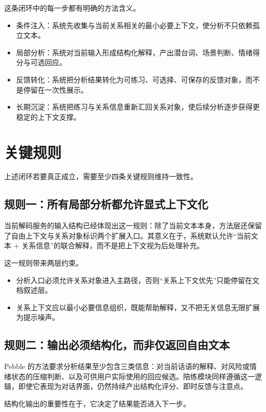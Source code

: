 这条闭环中的每一步都有明确的方法含义。

\begin{itemize}
  \item 条件注入：系统先收集与当前关系相关的最小必要上下文，使分析不只依赖孤立文本。
  \item 局部分析：系统对当前输入形成结构化解释，产出潜台词、场景判断、情绪得分与可选回应。
  \item 反馈转化：系统把分析结果转化为可练习、可选择、可保存的反馈对象，而不是停留在一次性展示。
  \item 长期沉淀：系统把练习与关系信息重新汇回关系对象，使后续分析逐步获得更稳定的上下文支撑。
\end{itemize}

\section{关键规则}

上述闭环若要真正成立，需要至少四条关键规则维持一致性。

\subsection{规则一：所有局部分析都允许显式上下文化}

当前解码服务的输入结构已经体现出这一规则：除了当前文本本身，方法层还保留了自由上下文与关系对象标识两个扩展入口。其意义在于，系统默认允许“当前文本 + 关系信息”的联合解释，而不是把上下文视为后处理补充。

这一规则带来两层约束。

\begin{itemize}
  \item 分析入口必须允许关系对象进入主路径，否则“关系上下文优先”只能停留在文档叙述层。
  \item 关系上下文应以最小必要信息组织，既能帮助解释，又不把无关信息无限扩展为提示噪声。
\end{itemize}

\subsection{规则二：输出必须结构化，而非仅返回自由文本}

Pebble 的方法要求分析结果至少包含三类信息：对当前话语的解释、对风险或情绪状态的压缩判断、以及可供用户实际使用的回应候选。陪练模块同样遵循这一逻辑，即使它表现为对话界面，仍然持续产出结构化评分、即时反馈与注意点。

结构化输出的重要性在于，它决定了结果能否进入下一步。

